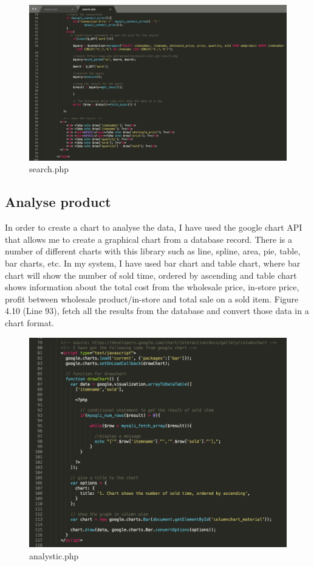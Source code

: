 \begin{figure}[H]
\centering
    \includegraphics[scale=0.34]
    {implement_image/search.png}
    \caption{search.php}
    \label{fig:search.php}
\end{figure}

\subsection{Analyse product}
In order to create a chart to analyse the data, I have used the google chart API that allows me to create a graphical chart from a database record. There is a number of different charts with this library such as line, spline, area, pie, table, bar charts, etc. In my system, I have used bar chart and table chart, where bar chart will show the number of sold time, ordered by ascending and table chart shows information about the total cost from the wholesale price, in-store price, profit between wholesale product/in-store and total sale on a sold item. Figure 4.10 (Line 93), fetch all the results from the database and convert those data in a chart format. 

\begin{figure}[H]
\centering
    \includegraphics[scale=0.5]
    {implement_image/analyse.png}
    \caption{analystic.php}
    \label{fig:analystic.php}
\end{figure}

